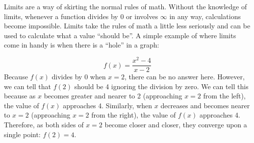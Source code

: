 \documentclass[../revisedMain.tex]{subfiles}
\begin{document}
	\par	Limits are a way of skirting the normal rules of math. Without the knowledge of limits, whenever a function divides by 0 or involves $\infty$ in any way, calculations become impossible. Limits take the rules of math a little less seriously and can be used to calculate what a value ``should be''. A simple example of where limits come in handy is when there is a ``hole'' in a graph:
	\begin{center}
	\end{center}
	$$f(x)=\frac{x^2-4}{x-2}$$
	Because $f(x)$ divides by 0 when $x=2$, there can be no answer here. However, we can tell that $f(2)$ should be 4 ignoring the division by zero. We can tell this because as $x$ becomes greater and nearer to 2 (approaching $x=2$ from the left), the value of $f(x)$ approaches 4. Similarly, when $x$ decreases and becomes nearer to $x=2$ (approaching $x=2$ from the right), the value of $f(x)$ approaches 4. Therefore, as both sides of $x=2$ become closer and closer, they converge upon a single point: $f(2)=4$.
\end{document}
